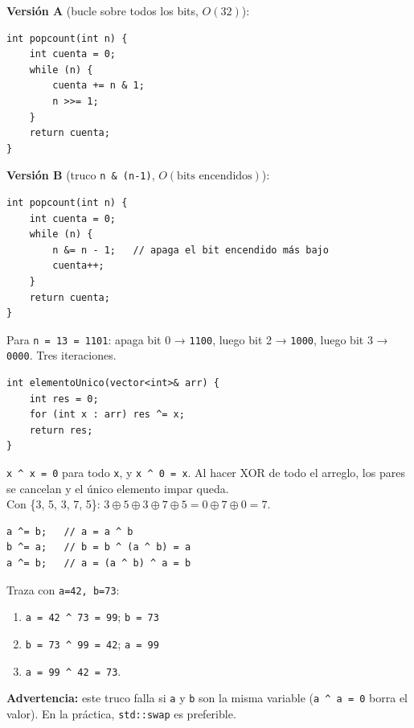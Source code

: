 \documentclass[12pt, oneside]{article}
\begin{document}
\begin{notaprofesor}
  \textbf{Versión A} (bucle sobre todos los bits, $O(32)$):
\begin{verbatim}
int popcount(int n) {
    int cuenta = 0;
    while (n) {
        cuenta += n & 1;
        n >>= 1;
    }
    return cuenta;
}
\end{verbatim}

  \textbf{Versión B} (truco \texttt{n \& (n-1)}, $O(\text{bits encendidos})$):
\begin{verbatim}
int popcount(int n) {
    int cuenta = 0;
    while (n) {
        n &= n - 1;   // apaga el bit encendido más bajo
        cuenta++;
    }
    return cuenta;
}
\end{verbatim}
  Para \texttt{n = 13 = 1101}: apaga bit 0 → \texttt{1100}, luego
  bit 2 → \texttt{1000}, luego bit 3 → \texttt{0000}. Tres iteraciones. \checkmark
\end{notaprofesor}

\begin{notaprofesor}
\begin{verbatim}
int elementoUnico(vector<int>& arr) {
    int res = 0;
    for (int x : arr) res ^= x;
    return res;
}
\end{verbatim}
  \texttt{x \textasciicircum{} x = 0} para todo \texttt{x}, y
  \texttt{x \textasciicircum{} 0 = x}. Al hacer XOR de todo el arreglo,
  los pares se cancelan y el único elemento impar queda.\\[4pt]
  Con \{3, 5, 3, 7, 5\}: $3\oplus5\oplus3\oplus7\oplus5 = 0\oplus7\oplus0 = 7$. \checkmark
\end{notaprofesor}

\begin{notaprofesor}
\begin{verbatim}
a ^= b;   // a = a ^ b
b ^= a;   // b = b ^ (a ^ b) = a
a ^= b;   // a = (a ^ b) ^ a = b
\end{verbatim}
  Traza con \texttt{a=42, b=73}:
  \begin{enumerate}
    \item \texttt{a = 42 \textasciicircum{} 73 = 99}; \texttt{b = 73}
    \item \texttt{b = 73 \textasciicircum{} 99 = 42}; \texttt{a = 99}
    \item \texttt{a = 99 \textasciicircum{} 42 = 73}. \checkmark
  \end{enumerate}
  \textbf{Advertencia:} este truco falla si \texttt{a} y \texttt{b} son
  la misma variable (\texttt{a \textasciicircum{} a = 0} borra el valor).
  En la práctica, \texttt{std::swap} es preferible.
\end{notaprofesor}
\end{document}
